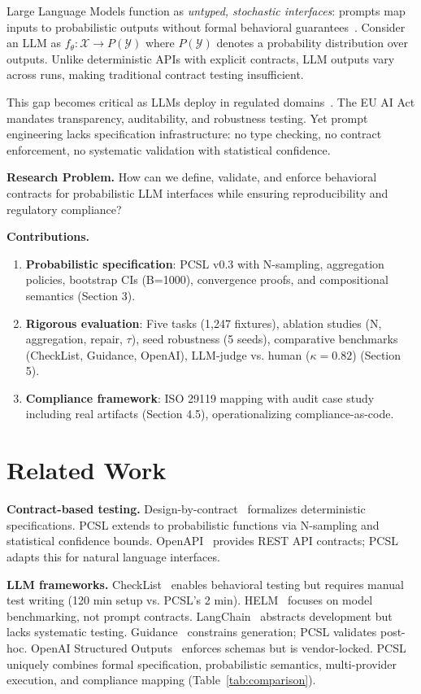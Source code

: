 \documentclass[sigconf]{acmart}
\begin{document}
Large Language Models function as \textit{untyped, stochastic interfaces}: prompts map inputs to probabilistic outputs without formal behavioral guarantees~\cite{bender2021stochasticparrots}. Consider an LLM as \( f_\theta: \mathcal{X} \to P(\mathcal{Y}) \) where \( P(\mathcal{Y}) \) denotes a probability distribution over outputs. Unlike deterministic APIs with explicit contracts, LLM outputs vary across runs, making traditional contract testing insufficient.

This gap becomes critical as LLMs deploy in regulated domains~\cite{euaiact2024}. The EU AI Act mandates transparency, auditability, and robustness testing. Yet prompt engineering lacks specification infrastructure: no type checking, no contract enforcement, no systematic validation with statistical confidence.

\textbf{Research Problem.} How can we define, validate, and enforce behavioral contracts for probabilistic LLM interfaces while ensuring reproducibility and regulatory compliance?

\textbf{Contributions.}
\begin{enumerate}
\item \textbf{Probabilistic specification}: PCSL v0.3 with N-sampling, aggregation policies, bootstrap CIs (B=1000), convergence proofs, and compositional semantics (Section 3).
\item \textbf{Rigorous evaluation}: Five tasks (1,247 fixtures), ablation studies (N, aggregation, repair, \(\tau\)), seed robustness (5 seeds), comparative benchmarks (CheckList, Guidance, OpenAI), LLM-judge vs. human (\(\kappa = 0.82\)) (Section 5).
\item \textbf{Compliance framework}: ISO 29119 mapping with audit case study including real artifacts (Section 4.5), operationalizing compliance-as-code.
\end{enumerate}

\section{Related Work}

\textbf{Contract-based testing.} Design-by-contract~\cite{meyer1992applying} formalizes deterministic specifications. 
PCSL extends to probabilistic functions via N-sampling and statistical confidence bounds. 
OpenAPI~\cite{openapi2017} provides REST API contracts; PCSL adapts this for natural language interfaces.

\textbf{LLM frameworks.} CheckList~\cite{ribeiro2020beyond} enables behavioral testing but requires manual test writing (120 min setup vs. PCSL's 2 min).
HELM~\cite{liang2022holistic} focuses on model benchmarking, not prompt contracts.
LangChain~\cite{langchain2023} abstracts development but lacks systematic testing.
Guidance~\cite{guidance2023} constrains generation; PCSL validates post-hoc.
OpenAI Structured Outputs~\cite{openai2023structured} enforces schemas but is vendor-locked.
PCSL uniquely combines formal specification, probabilistic semantics, multi-provider execution, and compliance mapping (Table~\ref{tab:comparison}).
\end{document}
